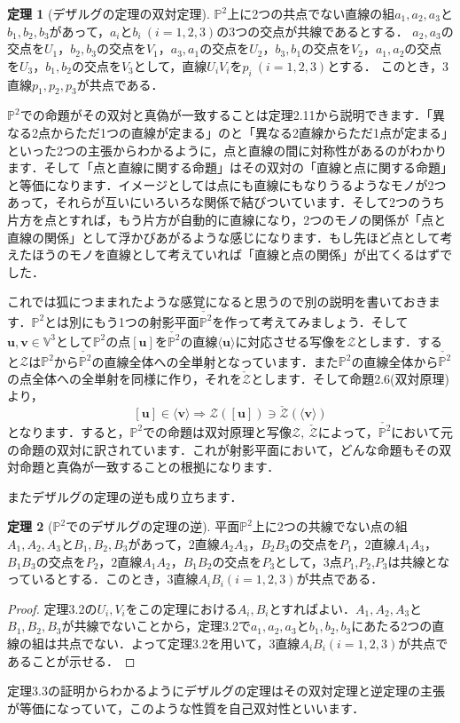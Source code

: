 \documentclass{jsarticle}
\theoremstyle{definition}
\newtheorem{theorem}{定理}
\numberwithin{theorem}{section}
\numberwithin{equation}{section}
\begin{document}
\begin{theorem}[デザルグの定理の双対定理]
$\mathbb{P}^2$上に2つの共点でない直線の組$a_1,a_2,a_3$と$b_1,b_2,b_3$があって，$a_i$と$b_i \ (i=1,2,3)$の3つの交点が共線であるとする．
$a_2,a_3$の交点を$U_1$，$b_2,b_3$の交点を$V_1$，$a_3,a_1$の交点を$U_2$，$b_3,b_1$の交点を$V_2$，$a_1,a_2$の交点を$U_3$，$b_1,b_2$の交点を$V_3$として，直線$U_i V_i$を$p_i \ (i=1,2,3)$とする．
このとき，3直線$p_1,p_2,p_3$が共点である．
\end{theorem}
$\mathbb{P}^2$での命題がその双対と真偽が一致することは定理2.11から説明できます．「異なる2点からただ1つの直線が定まる」のと「異なる2直線からただ1点が定まる」といった2つの主張からわかるように，点と直線の間に対称性があるのがわかります．そして「点と直線に関する命題」はその双対の「直線と点に関する命題」と等価になります．イメージとしては点にも直線にもなりうるようなモノが2つあって，それらが互いにいろいろな関係で結びついています．そして2つのうち片方を点とすれば，もう片方が自動的に直線になり，2つのモノの関係が「点と直線の関係」として浮かびあがるような感じになります．もし先ほど点として考えたほうのモノを直線として考えていれば「直線と点の関係」が出てくるはずでした．
\par これでは狐につままれたような感覚になると思うので別の説明を書いておきます．$\mathbb{P}^2$とは別にもう1つの射影平面$\check{\mathbb{P}^2}$を作って考えてみましょう．そして$\bm{u},\bm{v}\in \mathbb{V}^3$として$\mathbb{P}^2$の点$[\bm{u}]$を$\check{\mathbb{P}^2}$の直線$\langle \bm{u} \rangle$に対応させる写像を$\mathscr{Z}$とします．すると$\mathscr{Z}$は$\mathbb{P}^2$から$\check{\mathbb{P}^2}$の直線全体への全単射となっています．また$\mathbb{P}^2$の直線全体から$\check{\mathbb{P}^2}$の点全体への全単射を同様に作り，それを$\check{\mathscr{Z}}$とします．そして命題2.6(双対原理)より，
$$[\bm{u}]\in \langle \bm{v} \rangle \Rightarrow \mathscr{Z}([\bm{u}])\ni \check{\mathscr{Z}}(\langle \bm{v} \rangle)$$
となります．すると，$\mathbb{P}^2$での命題は双対原理と写像$\mathscr{Z},\ \check{\mathscr{Z}}$によって，$\check{\mathbb{P}^2}$において元の命題の双対に訳されています．これが射影平面において，どんな命題もその双対命題と真偽が一致することの根拠になります．
\par またデザルグの定理の逆も成り立ちます．
\begin{theorem}[$\mathbb{P}^2$でのデザルグの定理の逆]
平面$\mathbb{P}^2$上に$2$つの共線でない点の組$A_1 ,A_2 ,A_3$と$B_1 ,B_2 ,B_3$があって，$2$直線$A_2 A_3$，$B_2 B_3$の交点を$P_1$，$2$直線$A_1 A_3$，$B_1 B_3$の交点を$P_2$，$2$直線$A_1 A_2$，$B_1 B_2$の交点を$P_3$として，$3$点$P_1$,$P_2$,$P_3$は共線となっているとする．このとき，$3$直線$A_i B_i (i=1,2,3)$が共点である．
\end{theorem}
\begin{proof}
定理3.2の$U_i,V_i$をこの定理における$A_i,B_i$とすればよい．$A_1 ,A_2 ,A_3$と$B_1 ,B_2 ,B_3$が共線でないことから，定理3.2で$a_1,a_2,a_3$と$b_1,b_2,b_3$にあたる2つの直線の組は共点でない．よって定理3.2を用いて，$3$直線$A_i B_i (i=1,2,3)$が共点であることが示せる．
\end{proof}
定理3.3の証明からわかるようにデザルグの定理はその双対定理と逆定理の主張が等価になっていて，このような性質を自己双対性といいます．
\end{document}
